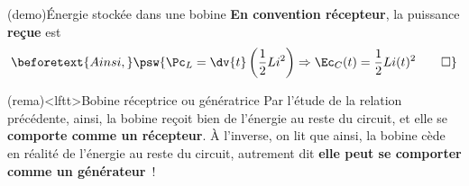\documentclass[../../main/main.tex]{subfiles}
\begin{document}
\begin{tcb*}(demo){Énergie stockée dans une bobine}
	\textbf{En convention récepteur}, la puissance \textbf{reçue} est
	\vspace{-15pt}
	{}
	\smallbreak
	\begin{gather*}
		\beforetext{Ainsi,}
		\psw{%
			\Pc_{L} = \dv{t} \left( \frac{1}{2} Li{}^2 \right)
			\Rightarrow \Ec_C(t) = \frac{1}{2}L i(t)^2
			\qed
		}%
	\end{gather*}
	\vspace{-15pt}
\end{tcb*}

\begin{tcb}[label=rema:genrec, sidebyside](rema)<lftt>{Bobine réceptrice ou
			génératrice}
	Par l'étude de la relation précédente,
	ainsi, la bobine reçoit bien de l'énergie au reste du circuit, et elle se
	\textbf{comporte comme un récepteur}.
	\tcblower
	À l'inverse, on lit que
	ainsi, la bobine cède en réalité de l'énergie au reste du circuit,
	autrement dit \textbf{elle peut se comporter comme un générateur}~!
\end{tcb}
\end{document}
